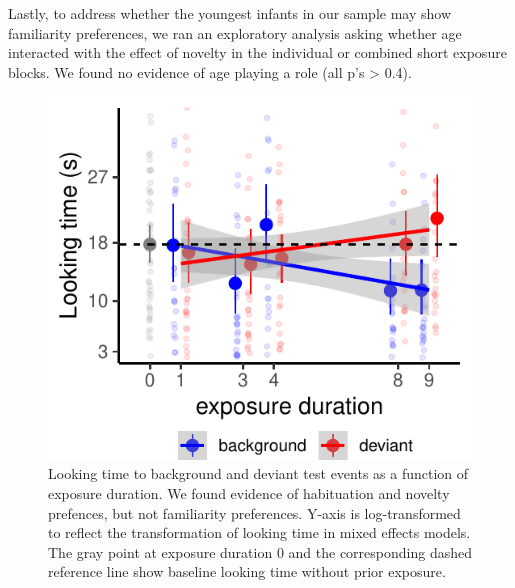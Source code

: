 \documentclass[10pt, letterpaper]{article}
\newenvironment{CodeChunk}{}{}
\begin{document}
Lastly, to address whether the youngest infants in our sample may show
familiarity preferences, we ran an exploratory analysis asking whether
age interacted with the effect of novelty in the individual or combined
short exposure blocks. We found no evidence of age playing a role (all
p's \textgreater{} 0.4).

\captionsetup{belowskip=45pt,aboveskip=4pt}

\begin{CodeChunk}
\begin{figure}[h]

\includegraphics{figs/infant_results-1} \hfill{}

\caption[Looking time to background and deviant test events as a function of exposure duration]{Looking time to background and deviant test events as a function of exposure duration. We found evidence of habituation and novelty prefences, but not familiarity preferences. Y-axis is log-transformed to reflect the transformation of looking time in mixed effects models. The gray point at exposure duration 0 and the corresponding dashed reference line show baseline looking time without prior exposure.}\label{fig:infant_results}
\end{figure}
\end{CodeChunk}

\captionsetup{belowskip=5pt,aboveskip=5pt}
\end{document}

